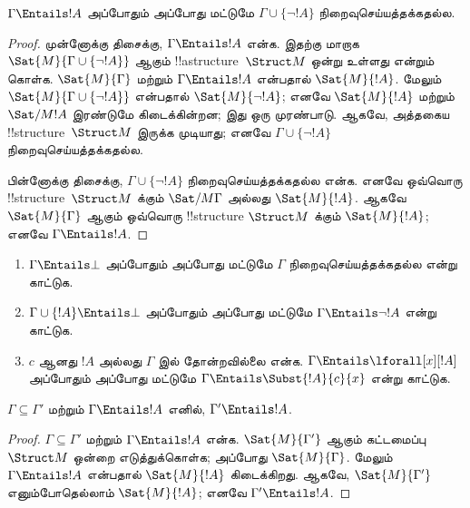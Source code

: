 \documentclass[../../../include/open-logic-section]{subfiles}
\begin{document}
\begin{prop}
$\Gamma \Entails !A$ அப்போதும் அப்போது மட்டுமே $\Gamma \cup \{\lnot !A\}$
நிறைவுசெய்யத்தக்கதல்ல.
\end{prop}

\begin{proof}
முன்னோக்கு திசைக்கு, $\Gamma \Entails !A$ என்க. இதற்கு மாறாக
$\Sat{M}{\Gamma \cup \{ \lnot !A \}}$ ஆகும்
!!a{structure}~$\Struct M$ ஒன்று உள்ளது என்றும் கொள்க.
$\Sat{M}{\Gamma}$ மற்றும் $\Gamma \Entails !A$ என்பதால்
$\Sat{M}{!A}$. மேலும் $\Sat{M}{\Gamma\cup \{ \lnot !A \}}$ என்பதால்
$\Sat{M}{\lnot !A}$; எனவே $\Sat{M}{!A}$ மற்றும் $\Sat/{M}{!A}$ இரண்டுமே
கிடைக்கின்றன; இது ஒரு முரண்பாடு. ஆகவே, அத்தகைய !!{structure}~$\Struct M$
இருக்க முடியாது; எனவே $\Gamma \cup \{ \lnot !A \}$
நிறைவுசெய்யத்தக்கதல்ல.

பின்னோக்கு திசைக்கு, $\Gamma \cup \{ \lnot !A \}$
நிறைவுசெய்யத்தக்கதல்ல என்க. எனவே ஒவ்வொரு
!!{structure}~$\Struct M$ க்கும் $\Sat/{M}{\Gamma}$ அல்லது
$\Sat{M}{!A}$. ஆகவே $\Sat{M}{\Gamma}$ ஆகும் ஒவ்வொரு !!{structure}
$\Struct M$ க்கும் $\Sat{M}{!A}$; எனவே $\Gamma \Entails !A$.
\end{proof}

\begin{prob}
\begin{enumerate}
\item $\Gamma \Entails \bot$ அப்போதும் அப்போது மட்டுமே $\Gamma$ நிறைவுசெய்யத்தக்கதல்ல என்று
  காட்டுக.
\item $\Gamma \cup \{!A\} \Entails \bot$ அப்போதும் அப்போது மட்டுமே
  $\Gamma \Entails \lnot !A$ என்று காட்டுக.
\item $c$ ஆனது $!A$ அல்லது $\Gamma$ இல் தோன்றவில்லை என்க.
  $\Gamma \Entails \lforall[x][!A]$ அப்போதும் அப்போது மட்டுமே
  $\Gamma \Entails \Subst{!A}{c}{x}$ என்று காட்டுக.
\end{enumerate}
\end{prob}

\begin{prop}
$\Gamma \subseteq \Gamma'$ மற்றும் $\Gamma \Entails !A$ எனில்,
$\Gamma' \Entails !A$.
\end{prop}

\begin{proof}
$\Gamma \subseteq \Gamma'$ மற்றும் $\Gamma \Entails !A$ என்க.
$\Sat{M}{\Gamma'}$ ஆகும் கட்டமைப்பு $\Struct M$ ஒன்றை எடுத்துக்கொள்க;
அப்போது $\Sat{M}{\Gamma}$. மேலும் $\Gamma \Entails !A$ என்பதால்
$\Sat{M}{!A}$ கிடைக்கிறது. ஆகவே, $\Sat{M}{\Gamma'}$ எனும்போதெல்லாம்
$\Sat{M}{!A}$; எனவே $\Gamma' \Entails !A$.
\end{proof}
\end{document}
